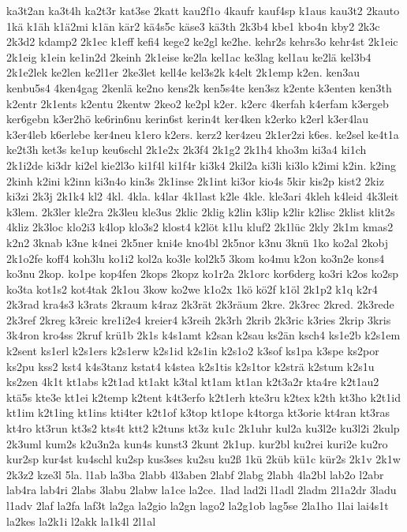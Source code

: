 {ka3t2an
ka3t4h
ka2t3r
kat3se
2katt
kau2f1o
4kaufr
kauf4sp
k1aus
kau3t2
2kauto
1kä
k1äh
k1ä2mi
k1än
kär2
kä4s5c
käse3
kä3th
2k3b4
kbe1
kbo4n
kby2
2k3c
2k3d2
kdamp2
2k1ec
k1eff
kefi4
kege2
ke2gl
ke2he.
kehr2s
kehrs3o
kehr4st
2k1eic
2k1eig
k1ein
ke1in2d
2keinh
2k1eise
ke2la
kel1ac
ke3lag
kel1au
ke2lä
kel3b4
2k1e2lek
ke2len
ke2l1er
2ke3let
kell4e
kel3s2k
k4elt
2k1emp
k2en.
ken3au
kenbu5s4
4ken4gag
2kenlä
ke2no
kens2k
ken5s4te
ken3sz
k2ente
k3enten
ken3th
k2entr
2k1ents
k2entu
2kentw
2keo2
ke2pl
k2er.
k2erc
4kerfah
k4erfam
k3ergeb
ker6gebn
k3er2hö
ke6rin6nu
kerin6st
kerin4t
ker4ken
k2erko
k2erl
k3er4lau
k3er4leb
k6erlebe
ker4neu
k1ero
k2ers.
kerz2
ker4zeu
2k1er2zi
k6es.
ke2sel
ke4t1a
ke2t3h
ket3s
ke1up
keu6schl
2k1e2x
2k3f4
2k1g2
2k1h4
kho3m
ki3a4
ki1ch
2k1i2de
ki3dr
ki2el
kie2l3o
ki1f4l
ki1f4r
ki3k4
2kil2a
ki3li
ki3lo
k2imi
k2in.
k2ing
2kinh
k2ini
k2inn
ki3n4o
kin3s
2k1inse
2k1int
ki3or
kio4s
5kir
kis2p
kist2
2kiz
ki3zi
2k3j
2k1k4
kl2
4kl.
4kla.
k4lar
4k1last
k2le
4kle.
kle3ari
4kleh
k4leid
4k3leit
k3lem.
2k3ler
kle2ra
2k3leu
kle3us
2klic
2klig
k2lin
k3lip
k2lir
k2lisc
2klist
klit2s
4kliz
2k3loc
klo2i3
k4lop
klo3s2
klost4
k2löt
k1lu
kluf2
2k1lüc
2kly
2k1m
kmas2
k2n2
3knab
k3ne
k4nei
2k5ner
kni4e
kno4bl
2k5nor
k3nu
3knü
1ko
ko2al
2kobj
2k1o2fe
koff4
koh3lu
ko1i2
kol2a
ko3le
kol2k5
3kom
ko4mu
k2on
ko3n2e
kons4
ko3nu
2kop.
ko1pe
kop4fen
2kops
2kopz
ko1r2a
2k1orc
kor6derg
ko3ri
k2os
ko2sp
ko3ta
kot1s2
kot4tak
2k1ou
3kow
ko2we
k1o2x
1kö
kö2f
k1öl
2k1p2
k1q
k2r4
2k3rad
kra4s3
k3rats
2kraum
k4raz
2k3rät
2k3räum
2kre.
2k3rec
2kred.
2k3rede
2k3ref
2kreg
k3reic
kre1i2e4
kreier4
k3reih
2k3rh
2krib
2k3ric
k3ries
2krip
3kris
3k4ron
kro4ss
2kruf
krü1b
2k1s
k4s1amt
k2san
k2sau
ks2än
ksch4
ks1e2b
k2s1em
k2sent
ks1erl
k2s1ers
k2s1erw
k2s1id
k2s1in
k2s1o2
k3sof
ks1pa
k3spe
ks2por
ks2pu
kss2
kst4
k4s3tanz
kstat4
k4stea
k2s1tis
k2s1tor
k2strä
k2stum
k2s1u
ks2zen
4k1t
kt1abs
k2t1ad
kt1akt
k3tal
kt1am
kt1an
k2t3a2r
kta4re
k2t1au2
ktä5s
kte3e
kt1ei
k2temp
k2tent
k4t3erfo
k2t1erh
kte3ru
k2tex
k2th
kt3ho
k2t1id
kt1im
k2t1ing
kt1ins
kti4ter
k2t1of
k3top
kt1ope
k4torga
kt3orie
kt4ran
kt3ras
kt4ro
kt3run
kt3s2
kts4t
ktt2
k2tuns
kt3z
ku1c
2k1uhr
kul2a
ku3l2e
ku3l2i
2kulp
2k3uml
kum2s
k2u3n2a
kun4s
kunst3
2kunt
2k1up.
kur2bl
ku2rei
kuri2e
ku2ro
kur2sp
kur4st
ku4schl
ku2sp
kus3ses
ku2su
ku2ß
1kü
2küb
kü1c
kür2s
2k1v
2k1w
2k3z2
kze3l
5la.
l1ab
la3ba
2labb
4l3aben
2labf
2labg
2labh
4la2bl
lab2o
l2abr
lab4ra
lab4ri
2labs
3labu
2labw
la1ce
la2ce.
1lad
lad2i
l1adl
2ladm
2l1a2dr
3ladu
l1adv
2laf
la2fa
laf3t
la2ga
la2gio
la2gn
lago2
la2g1ob
lag5se
2la1ho
1lai
lai4s1t
la2kes
la2k1i
l2akk
la1k4l
2l1al
}
